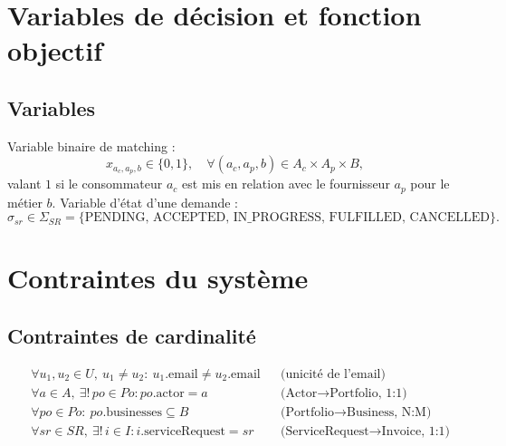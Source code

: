 \section{Variables de décision et fonction objectif}

\subsection{Variables}
Variable binaire de matching :
\[
x_{a_c, a_p, b} \in \{0,1\}, \quad \forall (a_c, a_p, b) \in A_c \times A_p \times B,
\]
valant $1$ si le consommateur $a_c$ est mis en relation avec le fournisseur $a_p$ pour le
métier $b$. Variable d'état d'une demande :
\[
\sigma_{sr} \in \Sigma_{SR} = \{\text{PENDING, ACCEPTED, IN\_PROGRESS, FULFILLED, CANCELLED}\}.
\]

\section{Contraintes du système}

\subsection{Contraintes de cardinalité}
\begin{align}
&\forall u_1, u_2 \in U,\ u_1 \neq u_2 : \ u_1.\text{email} \neq u_2.\text{email}
   &&\text{(unicité de l'email)}\\
&\forall a \in A,\ \exists!\, po \in Po : po.\text{actor} = a
   &&\text{(Actor} \to \text{Portfolio, 1:1)}\\
&\forall po \in Po : \ po.\text{businesses} \subseteq B
   &&\text{(Portfolio} \to \text{Business, N:M)}\\
&\forall sr \in SR,\ \exists!\, i \in I : i.\text{serviceRequest} = sr
   &&\text{(ServiceRequest} \to \text{Invoice, 1:1)}
\end{align}

